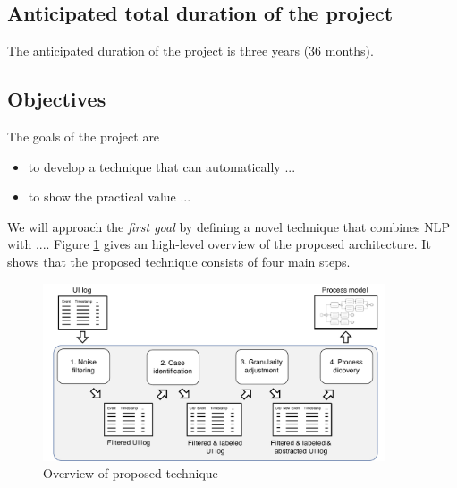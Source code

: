  \subsection{Anticipated total duration of the project}

The anticipated duration of the project is three years (36 months).

\subsection{Objectives}
\label{sec:objectives}

The goals of the project are 

\begin{itemize}
\item to develop a technique that can automatically ...   

\item to show the practical value ... 
\end{itemize}

We will approach the \textit{first goal} by defining a novel technique that combines NLP with .... Figure \ref{fig:approach} gives an high-level overview of the proposed architecture. It shows that the proposed technique consists of four main steps.    

\begin{figure}[h!]
\centering
\includegraphics[width=0.9\textwidth]{figures/approach.pdf}
\caption{Overview of proposed technique}
\label{fig:approach}
\end{figure}




